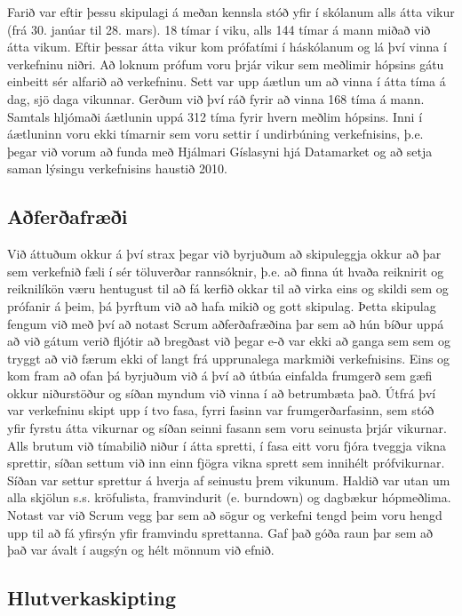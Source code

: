 \documentclass{article}
\begin{document}
Farið var eftir þessu skipulagi á meðan kennsla stóð yfir í skólanum alls átta vikur (frá 30. janúar til 28. mars). 18 tímar í viku, alls 144 tímar á mann miðað við átta vikum.
Eftir þessar átta vikur kom prófatími í háskólanum og lá því vinna í verkefninu niðri. 
Að loknum prófum voru þrjár vikur sem meðlimir hópsins gátu einbeitt sér alfarið að verkefninu. Sett var upp áætlun um að vinna í átta tíma á dag, sjö daga vikunnar. Gerðum við því ráð fyrir að vinna 168 tíma á mann. 
Samtals hljómaði áætlunin uppá 312 tíma fyrir hvern meðlim hópsins. Inni í áætluninn voru ekki tímarnir sem voru settir í undirbúning verkefnisins, þ.e. þegar við vorum að funda með Hjálmari Gíslasyni hjá Datamarket og að setja saman lýsingu verkefnisins haustið 2010.

\subsection{Aðferðafræði}

Við áttuðum okkur á því strax þegar við byrjuðum að skipuleggja okkur að þar sem verkefnið fæli í sér töluverðar rannsóknir, þ.e. að finna út hvaða reiknirit og reiknilíkön væru hentugust til að fá kerfið okkar til að virka eins og skildi sem og prófanir á þeim, þá þyrftum við að hafa mikið og gott skipulag. Þetta skipulag fengum við með því að notast Scrum aðferðafræðina þar sem að hún bíður uppá að við gátum verið fljótir að bregðast við þegar e-ð var ekki að ganga sem sem og tryggt að við færum ekki of langt frá upprunalega markmiði verkefnisins. 
Eins og kom fram að ofan þá byrjuðum við á því að útbúa einfalda frumgerð sem gæfi okkur niðurstöður og síðan myndum við vinna í að betrumbæta það. Útfrá því var verkefninu skipt upp í tvo fasa, fyrri fasinn var frumgerðarfasinn, sem stóð yfir fyrstu átta vikurnar og síðan seinni fasann sem voru seinusta þrjár vikurnar. Alls brutum við tímabilið niður í átta spretti, í fasa eitt voru fjóra tveggja vikna sprettir, síðan settum við inn einn fjögra vikna sprett sem innihélt prófvikurnar. Síðan var settur sprettur á hverja af seinustu þrem vikunum.
Haldið var utan um alla skjölun s.s. kröfulista, framvindurit (e. burndown) og dagbækur hópmeðlima. Notast var við Scrum vegg þar sem að sögur og verkefni tengd þeim voru hengd upp til að fá yfirsýn yfir framvindu sprettanna. Gaf það góða raun þar sem að það var ávalt í augsýn og hélt mönnum við efnið.

\subsection{Hlutverkaskipting}
\end{document}
